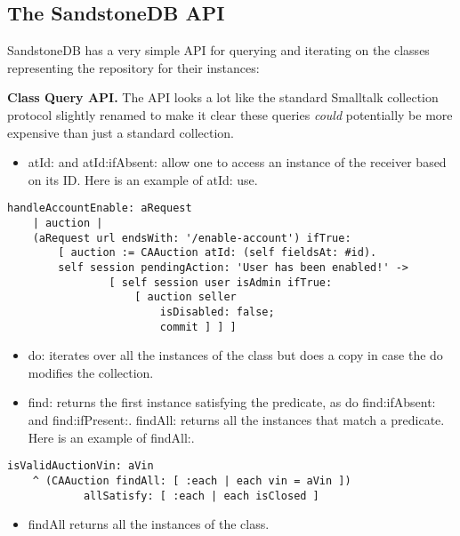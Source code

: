 \documentclass[a4paper,10pt,twoside]{book}
\newcommand{\ct}[1]{{\small\ttfamily\textup{#1}}}
\begin{document}
\subsection{The SandstoneDB API}
\label{book:advanced:persistency:sandstone:api}

SandstoneDB has a very simple API for querying and iterating on the classes representing the repository for their
instances:

\textbf{Class Query API.} The API looks a lot like the standard Smalltalk collection protocol slightly renamed to make it clear these queries \textit{could} potentially be more expensive than just a standard collection.

\begin{itemize}
\item  \ct{atId:} and \ct{atId:ifAbsent:} allow one to access an instance of the receiver based on its ID. Here is an example of \ct{atId:} use.
\end{itemize}

\begin{lstlisting}
handleAccountEnable: aRequest
    | auction |
    (aRequest url endsWith: '/enable-account') ifTrue:
        [ auction := CAAuction atId: (self fieldsAt: #id).
        self session pendingAction: 'User has been enabled!' ->
                [ self session user isAdmin ifTrue:
                    [ auction seller
                        isDisabled: false;
                        commit ] ] ]
\end{lstlisting}

\begin{itemize}
\item  \ct{do:} iterates over all the instances of the class but does a copy in case the do modifies the collection.
\item  \ct{find:} returns the first instance satisfying the predicate, as do \ct{find:ifAbsent:} and \ct{find:ifPresent:}. \ct{findAll:}   returns all the instances that match a predicate. Here is an example  of \ct{findAll:}.
\end{itemize}
\begin{lstlisting}
isValidAuctionVin: aVin
    ^ (CAAuction findAll: [ :each | each vin = aVin ])
            allSatisfy: [ :each | each isClosed ]
\end{lstlisting}
\begin{itemize}
\item  \ct{findAll} returns all the instances of the class.
\end{itemize}
\end{document}
